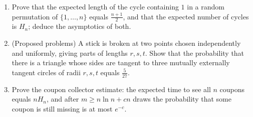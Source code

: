 \documentclass[11pt,a4paper]{article}
\renewcommand{\ge}{\geqslant}
\begin{document}
\begin{enumerate}
\item Prove that the expected length of the cycle containing $1$ in a random permutation of
$\{1,\dots,n\}$ equals $\frac{n+1}2$, and that the expected number of cycles is $H_n$; deduce the
asymptotics of both.

\item (Proposed problems) A stick is broken at two points chosen independently and uniformly, giving
parts of lengths $r,s,t$. Show that the probability that there is a triangle whose sides are tangent
to three mutually externally tangent circles of radii $r,s,t$ equals $\frac5{27}$.

\item Prove the coupon collector estimate: the expected time to see all $n$ coupons equals $nH_n$,
and after $m\ge n\ln n+cn$ draws the probability that some coupon is still missing is at most
$e^{-c}$.
\end{enumerate}
\end{document}
